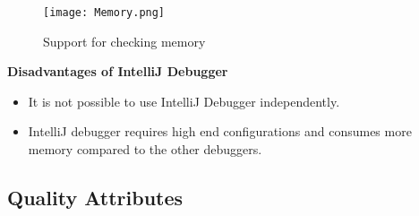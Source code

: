 \documentclass{article}
\begin{document}
\begin{figure}[htp]
    \centering
    \texttt{[image: Memory.png]}
    \caption{Support for checking memory}
    \label{Support for checking memory}
\end{figure}
\newpage
\textbf{Disadvantages of IntelliJ Debugger}
\begin{itemize}
    \item It is not possible to use IntelliJ Debugger independently. 
    \item IntelliJ debugger requires high end configurations and consumes more memory compared to the other debuggers.
\end{itemize}
\subsection{Quality Attributes}
\end{document}
